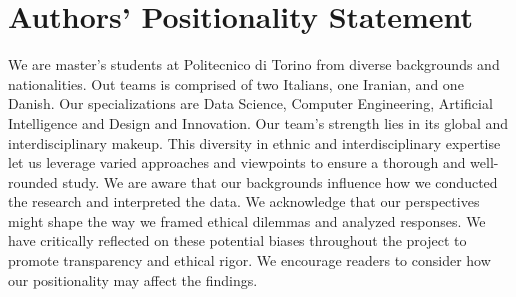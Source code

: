 \section{Authors' Positionality Statement}

We are master's students at Politecnico di Torino from diverse backgrounds and nationalities.
Out teams is comprised of two Italians, one Iranian, and one Danish.
Our specializations are Data Science, Computer Engineering, Artificial Intelligence and Design and Innovation.
Our team's strength lies in its global and interdisciplinary makeup. This diversity in ethnic and interdisciplinary expertise let us leverage varied approaches and viewpoints to ensure a thorough and well-rounded study.
We are aware that our backgrounds influence how we conducted the research and interpreted the data.
We acknowledge that our perspectives might shape the way we framed ethical dilemmas and analyzed responses.
We have critically reflected on these potential biases throughout the project to promote transparency and ethical rigor.
We encourage readers to consider how our positionality may affect the findings.
